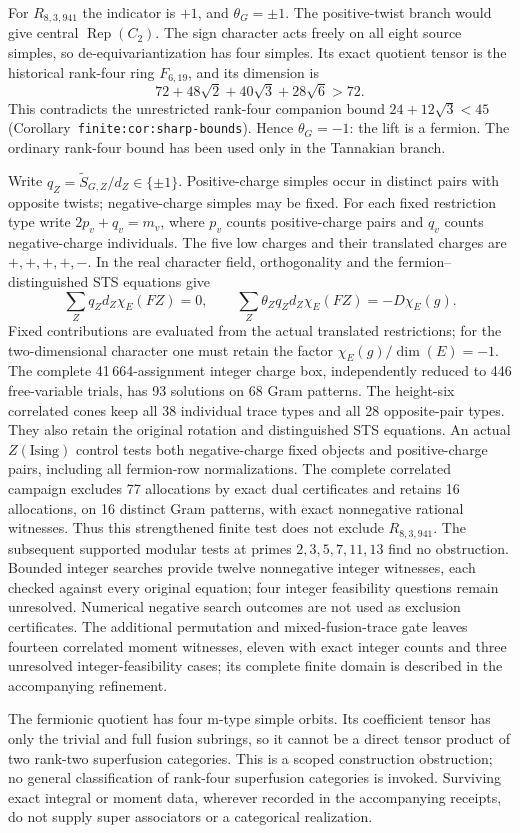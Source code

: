 For $R_{8,3,941}$ the indicator is $+1$, and $\theta_G=\pm1$.
The positive-twist branch would give central $\operatorname{Rep}(C_2)$.
The sign character acts freely on all eight source simples, so
de-equivariantization has four simples.  Its exact quotient tensor is
the historical rank-four ring $F_{6,19}$, and its dimension is
\[
 72+48\sqrt2+40\sqrt3+28\sqrt6>72.
\]
This contradicts the unrestricted rank-four companion bound
$24+12\sqrt3<45$ (Corollary~\texttt{finite:cor:sharp-bounds}).
Hence $\theta_G=-1$: the lift is a fermion.  The ordinary rank-four bound
has been used only in the Tannakian branch.

Write $q_Z=\widetilde S_{G,Z}/d_Z\in\{\pm1\}$.
Positive-charge simples occur in distinct pairs with opposite twists;
negative-charge simples may be fixed.  For each fixed restriction type
write $2p_v+q_v=m_v$, where $p_v$ counts positive-charge pairs and $q_v$
counts negative-charge individuals.  The five low charges and their
translated charges are $+,+,+,+,-$.  In the real character field,
orthogonality and the fermion--distinguished STS equations give
\[
 \sum_Z q_Zd_Z\chi_E(FZ)=0,
 \qquad
 \sum_Z\theta_Zq_Zd_Z\chi_E(FZ)=-D\chi_E(g).
\]
Fixed contributions are evaluated from the actual translated restrictions;
for the two-dimensional character one must retain the factor
$\chi_E(g)/\dim(E)=-1$.
The complete 41\,664-assignment integer charge box, independently reduced
to 446 free-variable trials, has 93 solutions on 68 Gram patterns.
The height-six correlated cones keep all 38 individual trace types and
all 28 opposite-pair types.  They also retain the original rotation and
distinguished STS equations.  An actual $Z(\mathrm{Ising})$ control tests
both negative-charge fixed objects and positive-charge pairs, including
all fermion-row normalizations.
The complete correlated campaign excludes 77 allocations by exact dual
certificates and retains 16 allocations, on 16 distinct Gram patterns,
with exact nonnegative rational witnesses.  Thus this strengthened finite
test does not exclude $R_{8,3,941}$.
The subsequent supported modular tests at primes $2,3,5,7,11,13$ find no
obstruction.  Bounded integer searches provide twelve nonnegative integer
witnesses, each checked against every original equation; four integer
feasibility questions remain unresolved.  Numerical negative search
outcomes are not used as exclusion certificates.
The additional permutation and mixed-fusion-trace gate leaves fourteen
correlated moment witnesses, eleven with exact integer counts and three
unresolved integer-feasibility cases; its complete finite domain is
described in the accompanying refinement.

The fermionic quotient has four m-type simple orbits.  Its coefficient
tensor has only the trivial and full fusion subrings, so it cannot be a
direct tensor product of two rank-two superfusion categories.  This is a
scoped construction obstruction; no general classification of rank-four
superfusion categories is invoked.  Surviving exact integral or moment
data, wherever recorded in the accompanying receipts, do not supply
super associators or a categorical realization.
